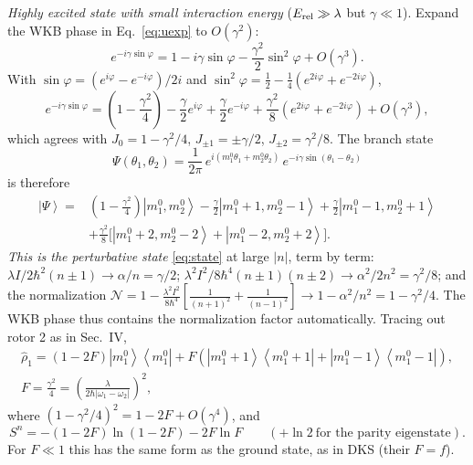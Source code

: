 \documentclass[aps,pra,onecolumn,notitlepage,nofootinbib,11pt]{revtex4-2}
\newcommand{\ket}[1]{\left|#1\right\rangle}
\newcommand{\ketbra}[2]{\left|#1\right\rangle\!\left\langle#2\right|}
\newcommand{\Erel}{E_{\rm rel}}
\begin{document}
\emph{Highly excited state with small interaction energy} ($\Erel\gg\lambda$ but
$\gamma\ll1$). Expand the WKB phase in Eq.~\eqref{eq:uexp} to $O(\gamma^{2})$:
\begin{equation}
e^{-i\gamma\sin\varphi}=1-i\gamma\sin\varphi-\frac{\gamma^{2}}{2}\sin^{2}\varphi+O(\gamma^{3}).
\end{equation}
With $\sin\varphi=(e^{i\varphi}-e^{-i\varphi})/2i$ and
$\sin^{2}\varphi=\frac12-\frac14(e^{2i\varphi}+e^{-2i\varphi})$,
\begin{equation}
e^{-i\gamma\sin\varphi}=\left(1-\frac{\gamma^{2}}{4}\right)-\frac{\gamma}{2}e^{i\varphi}
+\frac{\gamma}{2}e^{-i\varphi}+\frac{\gamma^{2}}{8}\left(e^{2i\varphi}+e^{-2i\varphi}\right)
+O(\gamma^{3}),
\label{eq:smallg}
\end{equation}
which agrees with $J_{0}=1-\gamma^{2}/4$, $J_{\pm1}=\pm\gamma/2$, $J_{\pm2}=\gamma^{2}/8$.
The branch state
\begin{equation}
\Psi(\theta_{1},\theta_{2})=\frac{1}{2\pi}\,e^{i(m_{1}^{0}\theta_{1}+m_{2}^{0}\theta_{2})}\,
e^{-i\gamma\sin(\theta_{1}-\theta_{2})}
\end{equation}
is therefore
\begin{align}
\ket\Psi={}&\left(1-\frac{\gamma^{2}}{4}\right)\ket{m_{1}^{0},m_{2}^{0}}
-\frac{\gamma}{2}\ket{m_{1}^{0}+1,m_{2}^{0}-1}+\frac{\gamma}{2}\ket{m_{1}^{0}-1,m_{2}^{0}+1}
\nonumber\\
&+\frac{\gamma^{2}}{8}\Big[\ket{m_{1}^{0}+2,m_{2}^{0}-2}+\ket{m_{1}^{0}-2,m_{2}^{0}+2}\Big].
\label{eq:Psismall}
\end{align}
\emph{This is the perturbative state} \eqref{eq:state} at large $|n|$, term by term:
$\lambda I/2\hbar^{2}(n\pm1)\to\alpha/n=\gamma/2$;
$\lambda^{2}I^{2}/8\hbar^{4}(n\pm1)(n\pm2)\to\alpha^{2}/2n^{2}=\gamma^{2}/8$; and the
normalization $\mathcal{N}=1-\frac{\lambda^{2}I^{2}}{8\hbar^{4}}[\frac{1}{(n+1)^{2}}
+\frac{1}{(n-1)^{2}}]\to1-\alpha^{2}/n^{2}=1-\gamma^{2}/4$. The WKB phase thus contains
the normalization factor automatically. Tracing out rotor 2 as in Sec.~IV,
\begin{equation}
\begin{gathered}
\hat\rho_{1}=(1-2F)\ketbra{m_{1}^{0}}{m_{1}^{0}}+F\left(\ketbra{m_{1}^{0}+1}{m_{1}^{0}+1}
+\ketbra{m_{1}^{0}-1}{m_{1}^{0}-1}\right),\\
F=\frac{\gamma^{2}}{4}=\left(\frac{\lambda}{2\hbar|\omega_{1}-\omega_{2}|}\right)^{2},
\end{gathered}
\label{eq:rhosmall}
\end{equation}
where $(1-\gamma^{2}/4)^{2}=1-2F+O(\gamma^{4})$, and
\begin{equation}
S^{n}=-(1-2F)\ln(1-2F)-2F\ln F\qquad(+\ln2\ \text{for the parity eigenstate}).
\label{eq:Ssmall}
\end{equation}
For $F\ll1$ this has the same form as the ground state, as in DKS (their $F=f$).
\end{document}
